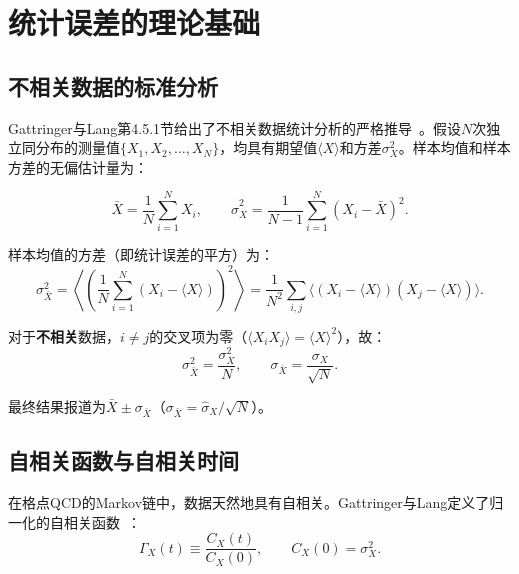 \documentclass[12pt,a4paper]{ctexart}
\theoremstyle{definition}
\begin{document}
\section{统计误差的理论基础}

\subsection{不相关数据的标准分析}

Gattringer与Lang第4.5.1节给出了不相关数据统计分析的严格推导~\cite{GattringerLang2010}。假设$N$次独立同分布的测量值$\{X_1, X_2, \dots, X_N\}$，均具有期望值$\langle X\rangle$和方差$\sigma_X^2$。样本均值和样本方差的无偏估计量为：

\begin{equation}
\bar X = \frac{1}{N}\sum_{i=1}^N X_i, \qquad
\hat\sigma_X^2 = \frac{1}{N-1}\sum_{i=1}^N (X_i - \bar X)^2.
\label{eq:unbiased_estimators}
\end{equation}

样本均值的方差（即统计误差的平方）为：
\begin{equation}
\sigma^2_{\bar X} = \left\langle \left(\frac{1}{N}\sum_{i=1}^N (X_i - \langle X\rangle)\right)^2 \right\rangle
= \frac{1}{N^2}\sum_{i,j} \langle (X_i-\langle X\rangle)(X_j-\langle X\rangle) \rangle.
\label{eq:var_derivation}
\end{equation}

对于\textbf{不相关}数据，$i\neq j$的交叉项为零（$\langle X_i X_j\rangle = \langle X\rangle^2$），故：
\begin{equation}
\boxed{\sigma^2_{\bar X} = \frac{\sigma_X^2}{N}}, \qquad
\sigma_{\bar X} = \frac{\sigma_X}{\sqrt{N}}.
\label{eq:uncorrelated_error}
\end{equation}

最终结果报道为$\bar X \pm \sigma_{\bar X}$（$\sigma_{\bar X} = \hat\sigma_X / \sqrt{N}$）。

\subsection{自相关函数与自相关时间}

在格点QCD的Markov链中，数据天然地具有自相关。Gattringer与Lang定义了归一化的自相关函数~\cite{GattringerLang2010}：
\begin{equation}
\Gamma_X(t) \equiv \frac{C_X(t)}{C_X(0)}, \qquad C_X(0) = \sigma_X^2.
\label{eq:normalized_autocorr}
\end{equation}
\end{document}
